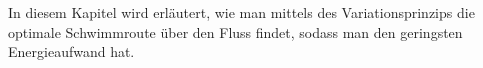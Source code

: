 \begin{refsection}
In diesem Kapitel wird erläutert, wie man mittels des Variationsprinzips die optimale Schwimmroute über den Fluss findet, sodass man den geringsten Energieaufwand hat.







% 
% 
% 



% 


% 



















\end{refsection}
